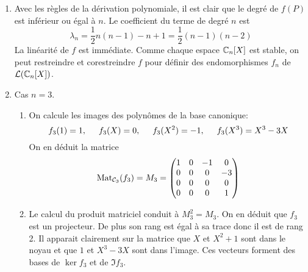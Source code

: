 \begin{enumerate}
  \item Avec les règles de la dérivation polynomiale, il est clair que le degré de $f(P)$ est inférieur ou égal à $n$. Le coefficient du terme de degré $n$ est
\begin{displaymath}
\lambda_n = \frac{1}{2}n(n-1) -n +1 = \frac{1}{2}(n-1)(n-2)  
\end{displaymath} 
La linéarité de $f$ est immédiate. Comme chaque espace $\mathbb{C}_n[X]$ est stable, on peut restreindre et corestreindre $f$ pour définir des endomorphismes $f_n$ de $\mathcal{L}(\mathbb{C}_n[X])$.
  \item Cas $n=3$.
\begin{enumerate}
  \item On calcule les images des polynômes de la base canonique:
\begin{displaymath}
f_3(1) = 1,\hspace{0.5cm} f_3(X)= 0, \hspace{0.5cm} f_3(X^2)= -1, \hspace{0.5cm} f_3(X^3) = X^3-3X  
\end{displaymath}
On en déduit la matrice
\begin{displaymath}
\operatorname{Mat}_{\mathcal{C}_3}(f_3) = M_3 =
\begin{pmatrix}
  1 & 0 & -1 & 0 \\ 0 & 0 & 0 & -3 \\ 0 & 0 & 0 & 0 \\ 0 & 0 & 0 & 1
\end{pmatrix}
\end{displaymath}

  \item Le calcul du produit matriciel conduit à $M_3^2 = M_3$. On en déduit que $f_3$ est un projecteur. De plus son rang est égal à sa trace donc il est de rang 2. Il apparait clairement sur la matrice que $X$ et $X^2 + 1$ sont dans le noyau et que $1$ et $X^3-3X$ sont dans l'image. Ces vecteurs forment des bases de $\ker f_3$ et de $\Im f_3$. 
\end{enumerate}


\end{enumerate}
